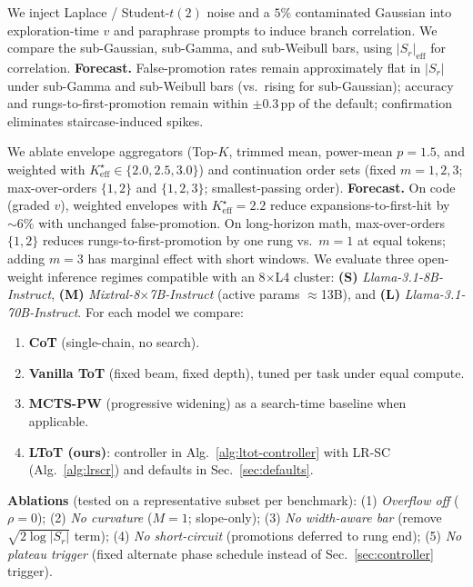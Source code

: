\documentclass{article}
\begin{document}
We inject Laplace / Student-$t(2)$ noise and a $5\%$ contaminated Gaussian into exploration-time $v$ and paraphrase prompts to induce branch correlation.
We compare the sub-Gaussian, sub-Gamma, and sub-Weibull bars, using $|S_r|_{\mathrm{eff}}$ for correlation.
\textbf{Forecast.} False-promotion rates remain approximately flat in $|S_r|$ under sub-Gamma and sub-Weibull bars (vs.\ rising for sub-Gaussian);
accuracy and rungs-to-first-promotion remain within $\pm 0.3$\,pp of the default; confirmation eliminates staircase-induced spikes.

We ablate envelope aggregators (Top-$K$, trimmed mean, power-mean $p{=}1.5$, and weighted with $K_{\mathrm{eff}}^\star\!\in\!\{2.0,2.5,3.0\}$)
and continuation order sets (fixed $m{=}1,2,3$; max-over-orders $\{1,2\}$ and $\{1,2,3\}$; smallest-passing order).
\textbf{Forecast.} On code (graded $v$), weighted envelopes with $K_{\mathrm{eff}}^\star{=}2.2$ reduce expansions-to-first-hit by $\sim\!6\%$ with unchanged false-promotion.
On long-horizon math, max-over-orders $\{1,2\}$ reduces rungs-to-first-promotion by one rung vs.\ $m{=}1$ at equal tokens; adding $m{=}3$ has marginal effect with short windows.
We evaluate three open-weight inference regimes compatible with an 8$\times$L4 cluster:
\textbf{(S)} \emph{Llama-3.1-8B-Instruct},
\textbf{(M)} \emph{Mixtral-8$\times$7B-Instruct} (active params $\approx$13B), and
\textbf{(L)} \emph{Llama-3.1-70B-Instruct}.
For each model we compare:

\begin{enumerate}[leftmargin=*, itemsep=2pt, topsep=2pt]
    \item \textbf{CoT} (single-chain, no search).
    \item \textbf{Vanilla ToT} (fixed beam, fixed depth), tuned per task under equal compute.
    \item \textbf{MCTS-PW} (progressive widening) as a search-time baseline when applicable.
    \item \textbf{LToT (ours)}: controller in Alg.~\ref{alg:ltot-controller} with LR-SC (Alg.~\ref{alg:lrscr}) and defaults in Sec.~\ref{sec:defaults}.
\end{enumerate}

\noindent\textbf{Ablations} (tested on a representative subset per benchmark):
(1) \emph{Overflow off} ($\rho{=}0$);
(2) \emph{No curvature} ($M{=}1$; slope-only);
(3) \emph{No width-aware bar} (remove $\sqrt{2\log |S_r|}$ term);
(4) \emph{No short-circuit} (promotions deferred to rung end);
(5) \emph{No plateau trigger} (fixed alternate phase schedule instead of Sec.~\ref{sec:controller} trigger).
\end{document}
